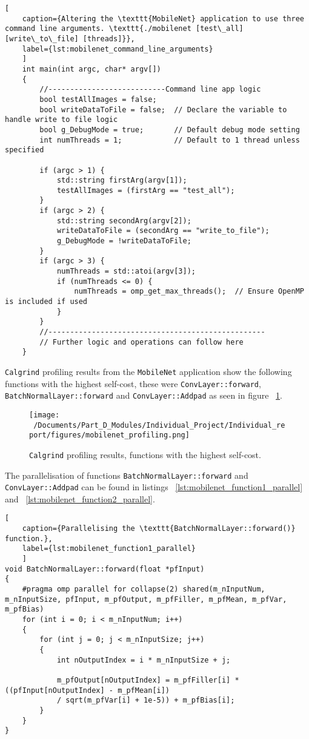 \begin{lstlisting}[
	caption={Altering the \texttt{MobileNet} application to use three command line arguments. \texttt{./mobilenet [test\_all] [write\_to\_file] [threads]}},
	label={lst:mobilenet_command_line_arguments}
	]
	int main(int argc, char* argv[])
	{
		//---------------------------Command line app logic
		bool testAllImages = false;
		bool writeDataToFile = false;  // Declare the variable to handle write to file logic
		bool g_DebugMode = true;       // Default debug mode setting
		int numThreads = 1;            // Default to 1 thread unless specified
		
		if (argc > 1) {
			std::string firstArg(argv[1]);
			testAllImages = (firstArg == "test_all");
		}
		if (argc > 2) {
			std::string secondArg(argv[2]);
			writeDataToFile = (secondArg == "write_to_file");
			g_DebugMode = !writeDataToFile; 
		}
		if (argc > 3) {
			numThreads = std::atoi(argv[3]);
			if (numThreads <= 0) {
				numThreads = omp_get_max_threads();  // Ensure OpenMP is included if used
			}
		}
		//--------------------------------------------------
		// Further logic and operations can follow here
	}
\end{lstlisting}


\texttt{Calgrind} profiling results from the \texttt{MobileNet} application show the following functions with the highest self-cost, these were \texttt{ConvLayer::forward}, \texttt{BatchNormalLayer::forward} and \texttt{ConvLayer::Addpad} as seen in figure ~\ref{fig:mobilenet_profiling}.

\begin{figure}[H] %
	\centering
	\texttt{[image: ~/Documents/Part\_D\_Modules/Individual\_Project/Individual\_report/figures/mobilenet\_profiling.png]} %
	\caption{\texttt{Calgrind} profiling results, functions with the highest self-cost.}
	\label{fig:mobilenet_profiling} %
\end{figure}


The parallelisation of functions \texttt{BatchNormalLayer::forward} and \texttt{ConvLayer::Addpad} can be found in listings ~\ref{lst:mobilenet_function1_parallel} and ~\ref{lst:mobilenet_function2_parallel}.

\begin{lstlisting}[
	caption={Parallelising the \texttt{BatchNormalLayer::forward()} function.},
	label={lst:mobilenet_function1_parallel}
	]
void BatchNormalLayer::forward(float *pfInput) 
{
	#pragma omp parallel for collapse(2) shared(m_nInputNum, m_nInputSize, pfInput, m_pfOutput, m_pfFiller, m_pfMean, m_pfVar, m_pfBias) 
	for (int i = 0; i < m_nInputNum; i++)
	{
		for (int j = 0; j < m_nInputSize; j++)
		{
			int nOutputIndex = i * m_nInputSize + j;
			
			m_pfOutput[nOutputIndex] = m_pfFiller[i] * ((pfInput[nOutputIndex] - m_pfMean[i])
			/ sqrt(m_pfVar[i] + 1e-5)) + m_pfBias[i];
		}
	}
}
\end{lstlisting}


